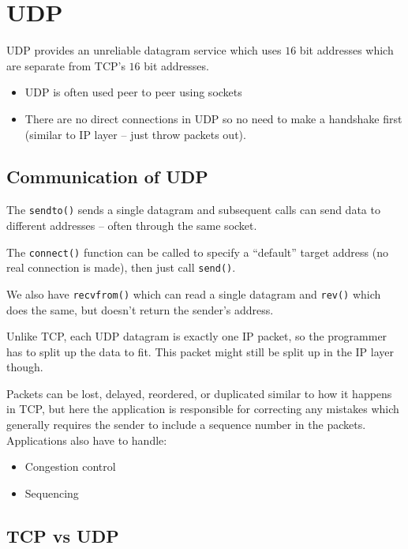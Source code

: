 \section{UDP}\label{sec:udp}

UDP provides an unreliable datagram service which uses \(16\) bit addresses which are separate from TCP's \(16\) bit addresses.
\begin{itemize}
    \item UDP is often used peer to peer using sockets
    \item There are no direct connections in UDP so no need to make a handshake first (similar to IP layer -- just throw packets out).
\end{itemize}

\subsection{Communication of UDP}\label{sub:communication_of_udp}

The \texttt{sendto()} sends a single datagram and subsequent calls can send data to different addresses -- often through the same socket.

The \texttt{connect()} function can be called to specify a ``default'' target address (no real connection is made), then just call \texttt{send()}.

We also have \texttt{recvfrom()} which can read a single datagram and \texttt{rev()} which does the same, but doesn't return the sender's address.

\begin{note}
    Unlike TCP, each UDP datagram is exactly one IP packet, so the programmer has to split up the data to fit.
    This packet might still be split up in the IP layer though.
\end{note}
\noindent
Packets can be lost, delayed, reordered, or duplicated similar to how it happens in TCP, but here the application is responsible for correcting any mistakes which generally requires the sender to include a sequence number in the packets.
Applications also have to handle:
\begin{itemize}
    \item Congestion control
    \item Sequencing
\end{itemize}

\subsection{TCP vs UDP}\label{sub:tcp_vs_udp}


